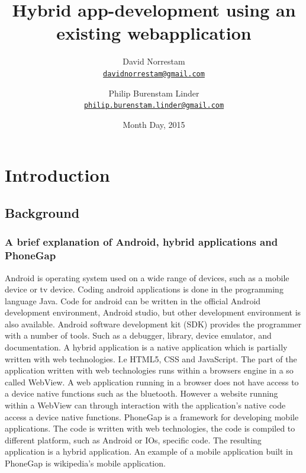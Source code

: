 \documentclass{cslthse-msc}
\author{
	David Norrestam \\
	{\normalsize \href{mailto:davidnorrestam@gmail.com}{\texttt{davidnorrestam@gmail.com}}}
	\and
	Philip Burenstam Linder \\
    {\normalsize \href{mailto:philip.burenstam.linder@gmail.com}{\texttt{philip.burenstam.linder@gmail.com}}}
}
\title{Hybrid app-development using an existing webapplication}
\date{Month Day, 2015}
\begin{document}
\makefrontmatter
\chapter{Introduction}
\section{Background}
\subsection{A brief explanation of Android, hybrid applications and PhoneGap}
Android is operating system used on a wide range of devices, such as a mobile device or tv device. Coding android applications is done in the programming language Java. Code for android can be written in the official Android development environment, Android studio, but other development environment is also available. 
\newline
\newline
Android software development kit (SDK) provides the programmer with a number of tools. Such as a debugger, library, device emulator, and documentation.  
\newline
\newline
A hybrid application is a native application which is partially written with web technologies. I.e HTML5, CSS and JavaScript. The part of the application written with web technologies runs within a browsers engine in a so called WebView. A web application running in a browser does not have access to a device native functions such as the bluetooth. However a website running within a WebView can through interaction with the application's native code access a device native functions.
\newline
\newline
PhoneGap is a framework for developing mobile applications. The code is written with web technologies, the code is compiled to different platform, such as Android or IOs, specific code. The resulting application is a hybrid application. An example of a mobile application built in PhoneGap is wikipedia's mobile application.  
\end{document}
